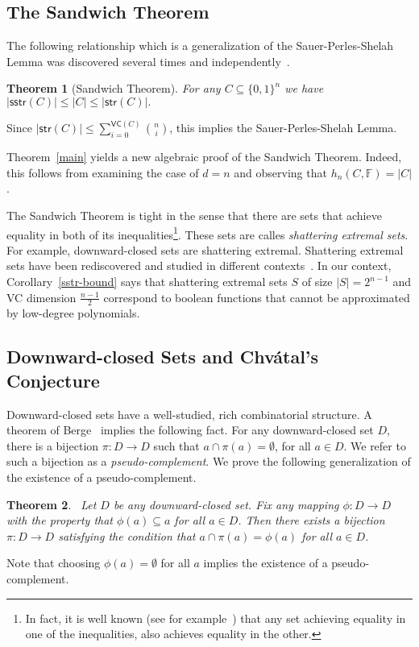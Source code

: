 \documentclass[11pt]{article}
\newtheorem{theorem}{Theorem}[section]
\theoremstyle{definition}
\newcommand{\1}{\mathbf{1}}
\newcommand{\F}{{\mathbb F}}
\renewcommand{\leq}{\leqslant}
\newcommand{\sstr}{\mathsf{sstr}}
\newcommand{\str}{\mathsf{str}}
\newcommand{\vc}{\mathsf{VC}}
\begin{document}
\subsection{The Sandwich Theorem}
The following relationship which is a generalization of the Sauer-Perles-Shelah Lemma was discovered several times and independently~\cite{br, pajor, dress,ShatNews}. 
\begin{theorem}[Sandwich Theorem] \label{thm:sandwich} For any $C \subseteq \{0,1\}^n$ we have 
$ |\sstr(C)| \leq |C| \leq |\str(C)|.$
\end{theorem}
\noindent
Since $|\str(C)| \leq \sum_{i=0}^{\vc(C)} {n \choose i}$, this implies the Sauer-Perles-Shelah  Lemma. 

Theorem~\ref{main} yields a new algebraic proof of the Sandwich Theorem.
Indeed, this follows from examining the case of $d=n$ and observing that $h_n(C,\F)=|C|$.

The Sandwich Theorem is tight in the sense that there are sets that achieve equality in both of its inequalities\footnote{In fact, it is well known (see for example~\cite{moran_thesis}) that any set achieving equality in one of the inequalities, also achieves equality in the other.}.
These sets are calles {\em shattering extremal sets}. For example, downward-closed sets are shattering extremal.
Shattering extremal sets have been rediscovered and studied in different contexts~\cite{Law,BR89,br,dress,Dress2,moran_thesis,KozmaM13,MeszarosR14,MoranW15}. 
In our context, Corollary~\ref{sstr-bound} says that shattering extremal sets $S$ of size $|S| = 2^{n-1}$ and VC dimension $\frac{n-1}{2}$ correspond to boolean functions that cannot be approximated by low-degree polynomials.  

\subsection{Downward-closed Sets and Chv\'{a}tal's Conjecture} 
Downward-closed sets have a well-studied, rich combinatorial structure.
A theorem of Berge~\cite{berge} implies the following fact.  For any downward-closed set $D$, there is a bijection $\pi: D \to D$ such that $a \cap \pi(a) = \emptyset$, for all $a \in D$.  We refer to such a bijection as a {\em pseudo-complement}. We prove the following generalization of the existence of a pseudo-complement.

\begin{theorem}~\label{pseudo} 
Let $D$ be any downward-closed set. Fix any mapping $\phi : D\to D$ with the property that $\phi(a) \subseteq a$ for all $a \in D$.   Then there exists a bijection $\pi : D\to D$ satisfying the condition that $a \cap \pi(a)= \phi(a)$ for all $a\in D$. 
\end{theorem}
\noindent 
Note that choosing $\phi(a) = \emptyset$ for all $a$ implies the existence of a  pseudo-complement.
\end{document}
